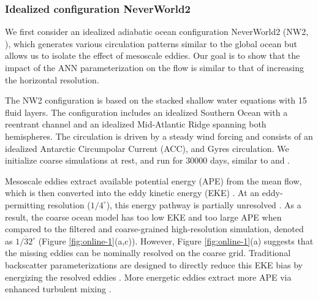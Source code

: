 \documentclass[draft]{agujournal2019}
\begin{document}

\subsubsection{Idealized configuration NeverWorld2} \label{sec:nw2}

We first consider an idealized adiabatic ocean configuration NeverWorld2 (NW2, ), which generates various circulation patterns similar to the global ocean but allows us to isolate the effect of mesoscale eddies. Our goal is to show that the impact of the ANN parameterization on the flow is similar to that of increasing the horizontal resolution. 

The NW2 configuration is based on the stacked shallow water equations with 15 fluid layers. The configuration includes an idealized Southern Ocean with a reentrant channel and an idealized Mid-Atlantic Ridge spanning both hemispheres. The circulation is driven by a steady wind forcing and consists of an idealized Antarctic Circumpolar Current (ACC), and Gyres circulation. We initialize coarse simulations at rest, and run for $30000$ days, similar to  and .

%
Mesoscale eddies extract available potential energy (APE) from the mean flow, which is then converted into the eddy kinetic energy (EKE) \cite{salmon1980baroclinic}. At an eddy-permitting resolution ($1/4^\circ$), this energy pathway is partially unresolved \cite{jansen2014parameterizing, mana2014toward, juricke2019ocean, loose2023diagnosing}. As a result, the coarse ocean model has too low EKE and too large APE when compared to the filtered and coarse-grained high-resolution simulation, denoted as $\overline{1/32^\circ}$ (Figure \ref{fig:online-1}(a,c)). However, Figure \ref{fig:online-1}(a) suggests that the missing eddies can be nominally resolved on the coarse grid. Traditional backscatter parameterizations are designed to directly reduce this EKE bias by energizing the resolved eddies \cite{jansen2014parameterizing}. More energetic eddies extract more APE via enhanced turbulent mixing \cite{yankovsky2024}.
\end{document}

